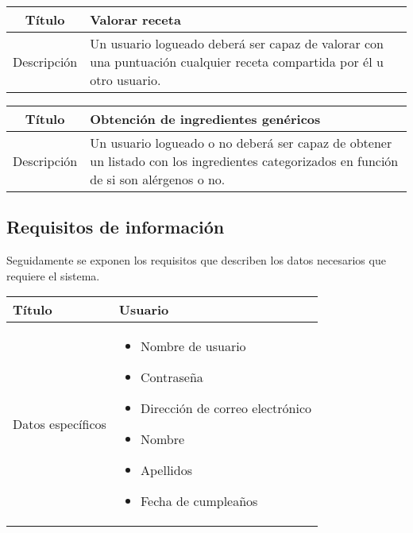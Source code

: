 \begin{center}
  
  \begin{tabularx}{\textwidth}{|c|X|}
    \hline
    Título & Valorar receta \\

    \hline

    Descripción & Un usuario logueado deberá ser capaz de valorar con una
    puntuación cualquier receta compartida por él u otro usuario. \\

    \hline
  \end{tabularx}
\end{center}

\begin{center}
  
  \begin{tabularx}{\textwidth}{|c|X|}
    \hline
    Título & Obtención de ingredientes genéricos \\

    \hline

    Descripción & Un usuario logueado o no deberá ser capaz de obtener un
    listado con los ingredientes categorizados en función de si son alérgenos
    o no.\\

    \hline
  \end{tabularx}
\end{center}

\subsection{Requisitos de información}
\label{sec:requisitos-informacion}

Seguidamente se exponen los requisitos que describen los datos necesarios que
requiere el sistema.

\begin{center}
  
  \begin{tabularx}{\textwidth}{|l|X|}
    \hline

    Título & Usuario\\

    \hline
    Datos específicos &

    \begin{itemize}
    \item Nombre de usuario
    \item Contraseña
    \item Dirección de correo electrónico
    \item Nombre
    \item Apellidos
    \item Fecha de cumpleaños
    \end{itemize}
    \\
    
    \hline
    
  \end{tabularx}
\end{center}


